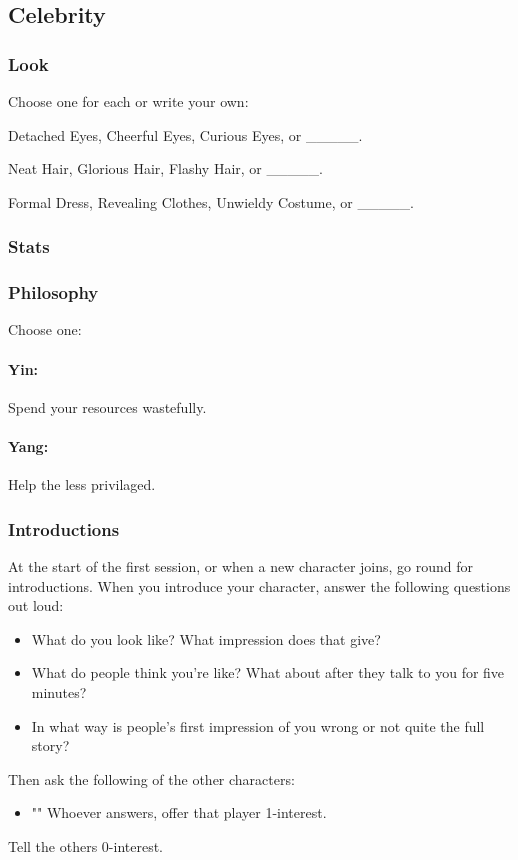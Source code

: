 \subsection{Celebrity}
{\itshape
}

\subsubsection{Look}
Choose one for each or write your own:

Detached Eyes, Cheerful Eyes, Curious Eyes, or \_\_\_\_\_.

Neat Hair, Glorious Hair, Flashy Hair, or \_\_\_\_\_.

Formal Dress, Revealing Clothes, Unwieldy Costume, or \_\_\_\_\_.

\subsubsection{Stats}

\subsubsection{Philosophy}
Choose one:
\paragraph{Yin:} Spend your resources wastefully.
\paragraph{Yang:} Help the less privilaged.

\subsubsection{Introductions}
At the start of the first session, or when a new character joins, go round for introductions.
When you introduce your character, answer the following questions out loud:
\begin{itemize}
\item What do you look like? What impression does that give?
\item What do people think you're like? What about after they talk to you for five minutes?
\item In what way is people's first impression of you wrong or not quite the full story?
\end{itemize}

Then ask the following of the other characters:
\begin{itemize}
\item "" Whoever answers, offer that player 1-interest.
\end{itemize}
Tell the others 0-interest.

